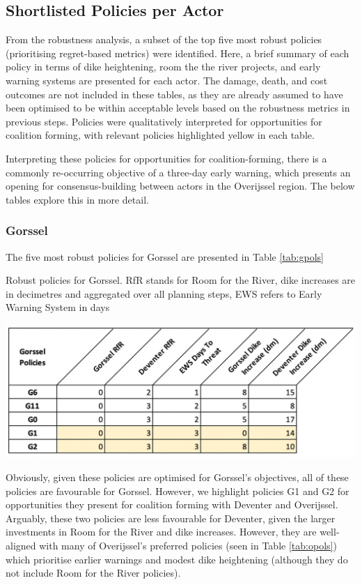 \subsection{Shortlisted Policies per Actor}
From the robustness analysis, a subset of the top five most robust policies (prioritising regret-based metrics) were identified. Here, a brief summary of each policy in terms of dike heightening, room the the river projects, and early warning systems are presented for each actor. The damage, death, and cost outcomes are not included in these tables, as they are already assumed to have been optimised to be within acceptable levels based on the robustness metrics in previous steps. Policies were qualitatively interpreted for opportunities for coalition forming, with relevant policies highlighted yellow in each table.

Interpreting these policies for opportunities for coalition-forming, there is a commonly re-occurring objective of a three-day early warning, which presents an opening for consensus-building between actors in the Overijssel region. The below tables explore this in more detail.

\subsubsection{Gorssel}
The five most robust policies for Gorssel are presented in Table \ref{tab:gpols}

\begin{table}[h!]
  \centering
  \captionsetup{justification=centering,margin=2cm}
  \caption{Robust policies for Gorssel. RfR stands for Room for the River, dike increases are in decimetres and aggregated over all planning steps, EWS refers to Early Warning System in days}
  \label{tab:gpols}
  \includegraphics[width=0.8\linewidth]{report/figures/gpols.png}
\end{table}

\noindent Obviously, given these policies are optimised for Gorssel's objectives, all of these policies are favourable for Gorssel. However, we highlight policies G1 and G2 for opportunities they present for coalition forming with Deventer and Overijssel. Arguably, these two policies are less favourable for Deventer, given the larger investments in Room for the River and dike increases. However, they are well-aligned with many of Overijssel's preferred policies (seen in Table \ref{tab:opols}) which prioritise earlier warnings and modest dike heightening (although they do not include Room for the River policies).

